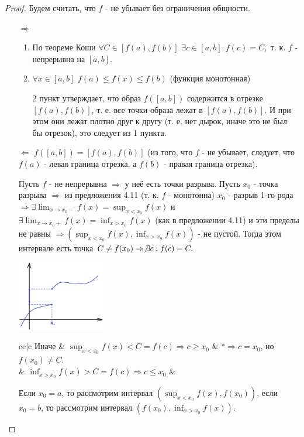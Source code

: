 	\begin{proof}
	    Будем считать, что $f$ - не убывает без ограничения общности.
	    \begin{itemize}
	    	\item[$\Rightarrow$]
		    \begin{enumerate}
		    	\item По теореме Коши $\forall C \in [f(a), f(b)]$ $\exists c \in [a, b]: f(c) = C,$ т. к. $f$ - непрерывна на $[a, b]$.
		    	\item $\forall x \in [a, b]$ $f(a) \leqslant f(x) \leqslant f(b)$ (функция монотонная)
		    	
		    	2 пункт утверждает, что образ $f([a, b])$ содержится в отрезке $[f(a), f(b)]$, т. е. все точки образа лежат в $[f(a), f(b)]$. И при этом они лежат плотно друг к другу (т. е. нет дырок, иначе это не был бы отрезок), это следует из 1 пункта.
		    \end{enumerate}
		    \item[$\Leftarrow$] $f([a, b]) = [f(a), f(b)]$ (из того, что $f$ - не убывает, следует, что $f(a)$ - левая граница отрезка, а $f(b)$ - правая граница отрезка).
		    
		    Пусть $f$ - не непрерывна $\Rightarrow$ у неё есть точки разрыва. Пусть $x_0$ - точка разрыва $\Rightarrow$ из предложения 4.11 (т. к. $f$ - монотонна) $x_0$ - разрыв 1-го рода $\Rightarrow \exists \lim_{x \to x_0-} f(x) = \sup_{x < x_0} f(x)$ и $\exists \lim_{x \to x_0+} f(x) = \inf_{x > x_0} f(x)$ (как в предложении 4.11) и эти пределы не равны $\Rightarrow (\sup_{x < x_0} f(x), \inf_{x > x_9} f(x))$ - не пустой. Тогда этом интервале есть точка $C \neq f(x_0) \Rightarrow \not\exists c: f(c) = C.$
		    
		    \begin{center}
		    	\includegraphics[width=0.3\textwidth]{img/lecture14/graph_of_monotonic _function}
		    \end{center}
		    
		    \begin{tabular}{cc|c}
		    	Иначе & $\sup_{x < x_0} f(x) < C = f(c) \Rightarrow c \geqslant x_0$ & *{$\Rightarrow c = x_0$, но $f(x_0) \neq C$.} \\
		    	& $\inf_{x > x_0} f(x) > C = f(c) \Rightarrow c \leqslant x_0$ &
		    \end{tabular}
		    
		    Если $x_0 = a$, то рассмотрим интервал $(\sup_{x < x_0} f(x), f(x_0))$, если $x_0 = b$, то рассмотрим интервал $(f(x_0), \inf_{x > x_0} f(x))$.
		\end{itemize}
	\end{proof}
	
